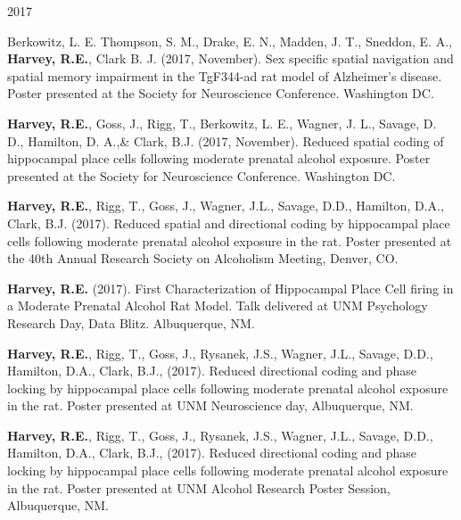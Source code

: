 \begin{cventries}
\cventry
    {} %
    {} %
    {} %
    {2017} %
    {
      \begin{cvitems} %
      \setlength\itemsep{0.4em}
        \item {Berkowitz, L. E. Thompson, S. M., Drake, E. N., Madden, J. T., Sneddon, E. A., \textbf{Harvey, R.E.}, Clark B. J. (2017, November). Sex specific spatial navigation and spatial memory impairment in the TgF344-ad rat model of Alzheimer’s disease. Poster presented at the Society for Neuroscience Conference. Washington DC.}
        \item {\textbf{Harvey, R.E.}, Goss, J., Rigg, T., Berkowitz, L. E., Wagner, J. L., Savage, D. D., Hamilton, D. A.,\& Clark, B.J. (2017, November). Reduced spatial coding of hippocampal place cells following moderate prenatal alcohol exposure. Poster presented at the Society for Neuroscience Conference. Washington DC.}
        \item {\textbf{Harvey, R.E.}, Rigg, T., Goss, J., Wagner, J.L., Savage, D.D., Hamilton, D.A., Clark, B.J. (2017). Reduced spatial and directional coding by hippocampal place cells following moderate prenatal alcohol exposure in the rat. Poster presented at the 40th Annual Research Society on Alcoholism Meeting, Denver, CO.}
        \item {\textbf{Harvey, R.E.} (2017). First Characterization of Hippocampal Place Cell firing in a Moderate Prenatal Alcohol Rat Model. Talk delivered at UNM Psychology Research Day, Data Blitz. Albuquerque, NM.}
        \item {\textbf{Harvey, R.E.}, Rigg, T., Goss, J., Rysanek, J.S., Wagner, J.L., Savage, D.D., Hamilton, D.A., Clark, B.J., (2017). Reduced directional coding and phase locking by hippocampal place cells following moderate prenatal alcohol exposure in the rat. Poster presented at UNM Neuroscience day, Albuquerque, NM.}
        \item {\textbf{Harvey, R.E.}, Rigg, T., Goss, J., Rysanek, J.S., Wagner, J.L., Savage, D.D., Hamilton, D.A., Clark, B.J., (2017). Reduced directional coding and phase locking by hippocampal place cells following moderate prenatal alcohol exposure in the rat. Poster presented at UNM Alcohol Research Poster Session, Albuquerque, NM.}      
      \end{cvitems}
    }
\end{cventries}

